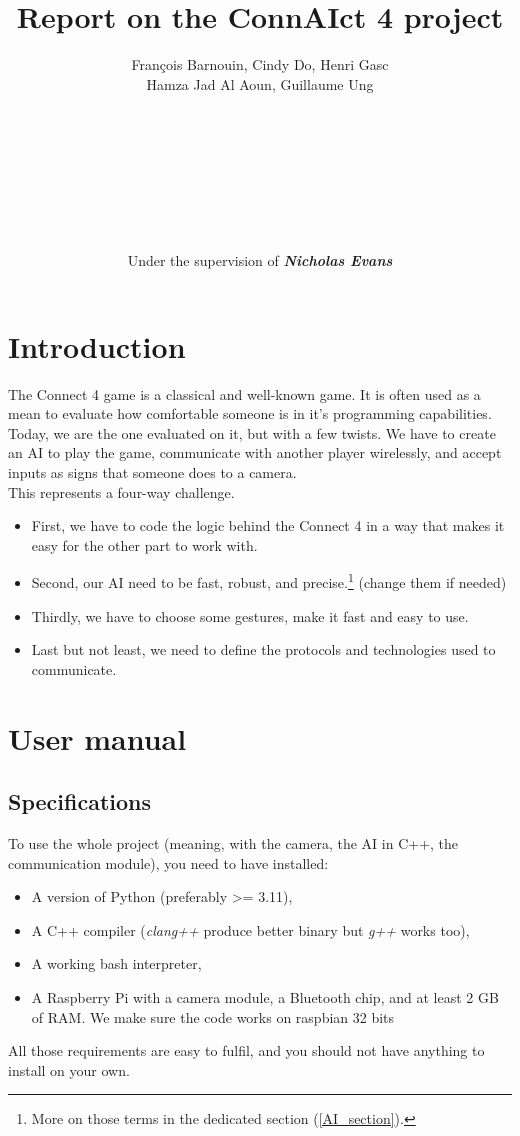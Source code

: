 \documentclass[12pt, a4paper, oneside]{report}
\title{\textbf{Report on the ConnAIct 4 project}}
\author{\normalsize François Barnouin, Cindy Do, Henri Gasc\\\normalsize Hamza Jad Al Aoun, Guillaume Ung\\\\\\\\\\\\\\\\\\Under the supervision of \textbf{\textit{Nicholas Evans}}}
\date{}
\begin{document}
	\maketitle
	\tableofcontents

	\chapter{Introduction}
	The Connect 4 game is a classical and well-known game. It is often used as a mean to evaluate how comfortable someone is in it's programming capabilities. \\
	Today, we are the one evaluated on it, but with a few twists. We have to create an AI to play the game, communicate with another player wirelessly, and accept inputs as signs that someone does to a camera. \\
	This represents a four-way challenge.
	\begin{itemize}
		\item First, we have to code the logic behind the Connect 4 in a way that makes it easy for the other part to work with.
		\item Second, our AI need to be fast, robust, and precise.\footnote{More on those terms in the dedicated section (\ref{AI_section}).} (change them if needed)
		\item Thirdly, we have to choose some gestures, make it fast and easy to use.
		\item Last but not least, we need to define the protocols and technologies used to communicate.
	\end{itemize}

	\chapter{User manual}

	\section{Specifications}
	To use the whole project (meaning, with the camera, the AI in C++, the communication module), you need to have installed:
	\begin{itemize}
		\item A version of Python (preferably >= 3.11),
		\item A C++ compiler (\textit{clang++} produce better binary but \textit{g++} works too),
		\item A working bash interpreter,
		\item A Raspberry Pi with a camera module, a Bluetooth chip, and at least 2 GB of RAM. We make sure the code works on raspbian 32 bits
	\end{itemize}
	All those requirements are easy to fulfil, and you should not have anything to install on your own. \\
\end{document}

